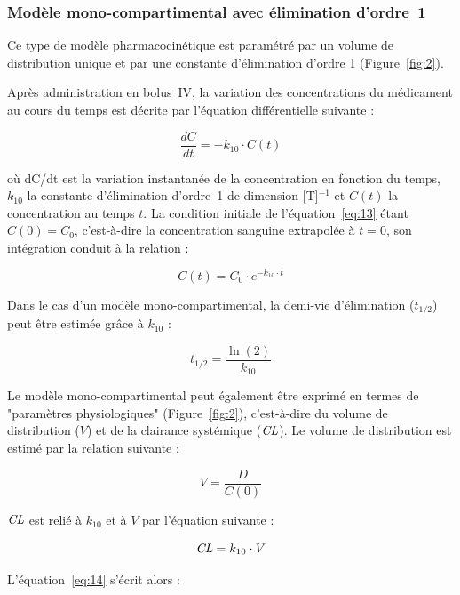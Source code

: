 \subsubsection{Modèle mono-compartimental avec élimination d'ordre~1}
Ce type de modèle pharmacocinétique est paramétré par un volume de distribution unique et par une constante d'élimination d'ordre 1 (Figure~\ref{fig:2}).

Après administration en bolus~\gls{IV}, la variation des concentrations du médicament au cours du temps est décrite par l'équation différentielle suivante :

\begin{equation}
\frac{dC}{dt} = -k_{10} \cdot C(t)
\label{eq:13}
\end{equation}

où dC/dt est la variation instantanée de la concentration en fonction du temps, $k_{10}$ la constante d'élimination d'ordre~1 de dimension [T]$^{-1}$ et $C(t)$ la concentration au temps $t$. La condition initiale de l'équation~\ref{eq:13} étant $C(0) = C_0$, c'est-à-dire la concentration sanguine extrapolée à $t = 0$, son intégration conduit à la relation :

\begin{equation}
C(t) = C_0 \cdot e^{-k_{10}\cdot t}
\label{eq:14}
\end{equation}

Dans le cas d'un modèle mono-compartimental, la demi-vie d'élimination ($t_{1/2}$) peut être estimée grâce à $k_{10}$ :

\begin{equation}
t_{1/2} = \frac{\ln(2)}{k_{10}}
\label{eq:15}
\end{equation}

Le modèle mono-compartimental peut également être exprimé en termes de "paramètres physiologiques" (Figure~\ref{fig:2}), c'est-à-dire du volume de distribution ($V$) et de la clairance systémique ($\operatorname{\textit{CL}}$). Le volume de distribution est estimé par la relation suivante :

\begin{equation}
V = \frac{D}{C(0)}
\label{eq:16}
\end{equation}

$\operatorname{\textit{CL}}$ est relié à $k_{10}$ et à $V$ par l'équation suivante :

\begin{equation}
\operatorname{\textit{CL}} = k_{10} \cdot V
\label{eq:17}
\end{equation}

L'équation~\ref{eq:14} s'écrit alors :

